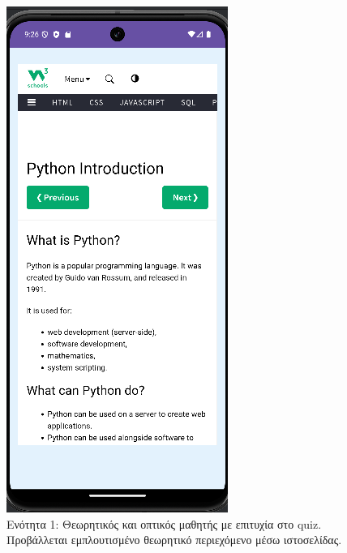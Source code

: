 \documentclass[11pt]{report}
\begin{document}
\begin{figure}[H]
  \centering
  \begin{minipage}[b]{0.9\linewidth}
    \centering
    \includegraphics[width=\linewidth, height=0.35\textheight, keepaspectratio]{Figures/εικόνα (1).png}
    \caption{Ενότητα 1: Θεωρητικός και οπτικός μαθητής με επιτυχία στο quiz. Προβάλλεται εμπλουτισμένο θεωρητικό περιεχόμενο μέσω ιστοσελίδας.}
  \end{minipage}
  

\end{figure}
\end{document}
